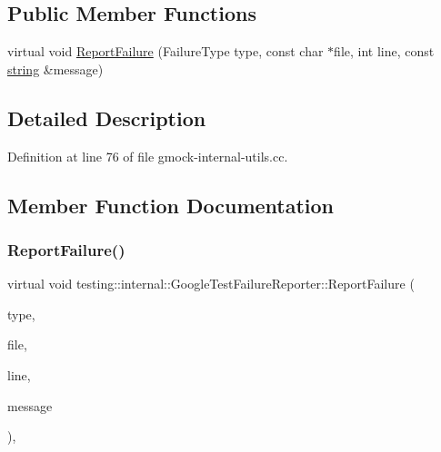 \subsection*{Public Member Functions}
\begin{DoxyCompactItemize}
\item 
virtual void \hyperlink{classtesting_1_1internal_1_1GoogleTestFailureReporter_a9b2f81e6c5b6e9f618fd75cc3e27e94c}{Report\+Failure} (Failure\+Type type, const char $\ast$file, int line, const \hyperlink{namespacetesting_1_1internal_a8e8ff5b11e64078831112677156cb111}{string} \&message)
\end{DoxyCompactItemize}


\subsection{Detailed Description}


Definition at line 76 of file gmock-\/internal-\/utils.\+cc.



\subsection{Member Function Documentation}
\mbox{\label{classtesting_1_1internal_1_1GoogleTestFailureReporter_a9b2f81e6c5b6e9f618fd75cc3e27e94c}} 
\subsubsection{\texorpdfstring{Report\+Failure()}{ReportFailure()}}
{\footnotesize\ttfamily virtual void testing\+::internal\+::\+Google\+Test\+Failure\+Reporter\+::\+Report\+Failure (\begin{DoxyParamCaption}\item[{Failure\+Type}]{type,  }\item[{const char $\ast$}]{file,  }\item[{int}]{line,  }\item[{const \hyperlink{namespacetesting_1_1internal_a8e8ff5b11e64078831112677156cb111}{string} \&}]{message }\end{DoxyParamCaption})\hspace{0.3cm}{\ttfamily [inline]}, {\ttfamily [virtual]}}



